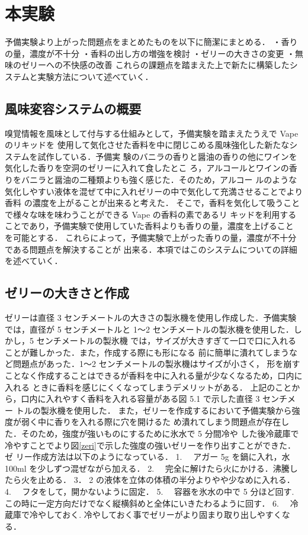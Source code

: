 \section{本実験}
予備実験より上がった問題点をまとめたものを以下に簡潔にまとめる．
・香りの量，濃度が不十分
・香料の出し方の増強を検討
・ゼリーの大きさの変更
・無味のゼリーへの不快感の改善
これらの課題点を踏まえた上で新たに構築したシステムと実験方法について述べていく．


\subsection{風味変容システムの概要}

嗅覚情報を風味として付与する仕組みとして，予備実験を踏まえたうえで Vape のリキッドを
使用して気化させた香料を中に閉じこめる風味強化した新たなシステムを試作している．予備実
験のバニラの香りと醤油の香りの他にワインを気化した香りを空洞のゼリーに入れて食したとこ
ろ，アルコールとワインの香りをバニラと醤油の二種類よりも強く感じた．そのため，アルコー
ルのような気化しやすい液体を混ぜて中に入れゼリーの中で気化して充満させることでより香料
の濃度を上がることが出来ると考えた．
そこで，香料を気化して吸うことで様々な味を味わうことができる Vape の香料の素であるリ
キッドを利用することであり，予備実験で使用していた香料よりも香りの量，濃度を上げること
を可能とする．
これらによって，予備実験で上がった香りの量，濃度が不十分である問題点を解決することが
出来る．本項ではこのシステムについての詳細を述べていく．


\subsection{ゼリーの大きさと作成}

ゼリーは直径 3 センチメートルの大きさの製氷機を使用し作成した．予備実験では，直径が 5
センチメートルと 1～2 センチメートルの製氷機を使用した．しかし，5 センチメートルの製氷機
では，サイズが大きすぎて一口で口に入れることが難しかった．また，作成する際にも形になる
前に簡単に潰れてしまうなど問題点があった．1～2 センチメートルの製氷機はサイズが小さく，
形を崩すことなく作成することはできるが香料を中に入れる量が少なくなるため，口内に入れる
ときに香料を感じにくくなってしまうデメリットがある．
上記のことから，口内に入れやすく香料を入れる容量がある図 5.1 で示した直径 3 センチメー
トルの製氷機を使用した．
また，ゼリーを作成するにおいて予備実験から強度が弱く中に香りを入れる際に穴を開けるた
め潰れてしまう問題点が存在した．そのため，強度が強いものにするために氷水で 5 分間冷や
した後冷蔵庫で冷やすことでより図\ref{zeri}で示した強度の強いゼリーを作り出すことができた．ゼ
リー作成方法は以下のようになっている．
1. 　アガー 5g を鍋に入れ，水 100ml を少しずつ混ぜながら加える．
2. 　完全に解けたら火にかける．沸騰したら火を止める．
3． 2 の液体を立体の体積の半分よりやや少なめに入れる．
4. 　フタをして，開かないように固定．
5. 　容器を氷水の中で 5 分ほど回す. この時に一定方向だけでなく縦横斜めと全体にいきたわるように回す．
6. 　冷蔵庫で冷やしておく. 冷やしておく事でゼリーがより固まり取り出しやすくなる．


